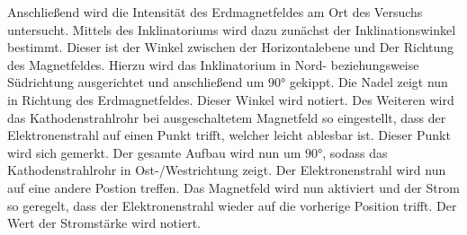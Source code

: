     Anschließend wird die Intensität des Erdmagnetfeldes am Ort des Versuchs untersucht. Mittels des Inklinatoriums wird dazu zunächst der
    Inklinationswinkel bestimmt. Dieser ist der Winkel zwischen der Horizontalebene und Der Richtung des Magnetfeldes. Hierzu wird das 
    Inklinatorium in Nord- beziehungsweise Südrichtung ausgerichtet und anschließend um $90°$ gekippt. Die Nadel zeigt nun in Richtung des
    Erdmagnetfeldes. Dieser Winkel wird notiert. Des Weiteren wird das Kathodenstrahlrohr bei ausgeschaltetem Magnetfeld so eingestellt, dass
    der Elektronenstrahl auf einen Punkt trifft, welcher leicht ablesbar ist. Dieser Punkt wird sich gemerkt. Der gesamte Aufbau wird nun um $90°$,
    sodass das Kathodenstrahlrohr in Ost-/Westrichtung zeigt. Der Elektronenstrahl wird nun auf eine andere Postion treffen. 
    Das Magnetfeld wird nun aktiviert und der Strom so geregelt, dass der Elektronenstrahl 
    wieder auf die vorherige Position trifft. Der Wert der Stromstärke wird notiert.